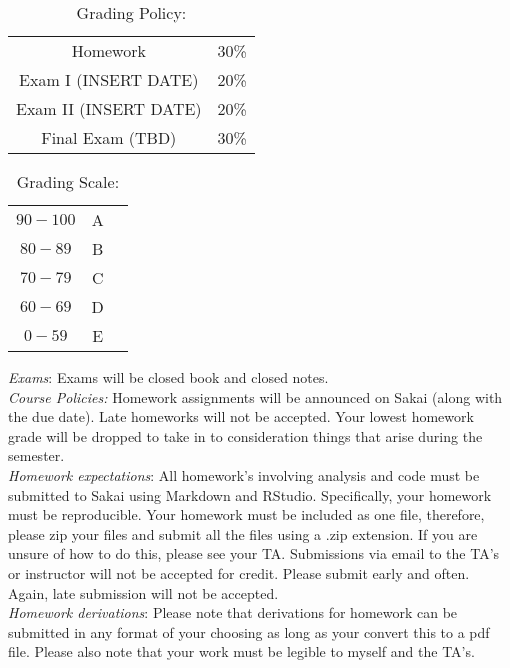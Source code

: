 \documentclass[11pt]{article}
\begin{document}
\begin{table}[ht]
\caption{Grading Policy:}
\begin{center}
\begin{tabular}{cc}
Homework &30\%\\
Exam I (INSERT DATE) &20\%\\
Exam  II (INSERT DATE) & 20\%\\
Final Exam  (TBD) & 30\%\\
\end{tabular}
\end{center}
\label{default}
\end{table}%


\begin{table}[ht]
\caption{Grading Scale:}
\begin{center}
\begin{tabular}{ccc}
$90-100$ &A\\
$80-89$ & B\\
$70-79$ & C\\
$60-69$ & D\\
$0-59$ &  E\\
\end{tabular}
\end{center}
\label{default}
\end{table}%

\emph{Exams}: Exams will be closed book and closed notes.\\

\emph{Course Policies:} 
Homework assignments will be announced on Sakai (along with the due date). Late homeworks will not be accepted. Your lowest homework grade will be dropped to take in to consideration things that arise during the semester. \\

\emph{Homework expectations}: All homework's involving analysis and code must be submitted to Sakai using Markdown and RStudio. Specifically, your homework must be reproducible. Your homework must be included as one file, therefore, please zip your files and submit all the files using a .zip extension. If you are unsure of how to do this, please see your TA. Submissions via email to the TA's or instructor will not be accepted for credit. Please submit early and often. Again, late submission will not be accepted. \\

\emph{Homework derivations}: Please note that derivations for homework can be submitted in any format of your choosing as long as your convert this to a pdf file. Please also note that your work must be legible to myself and the TA's. \\
\end{document}
